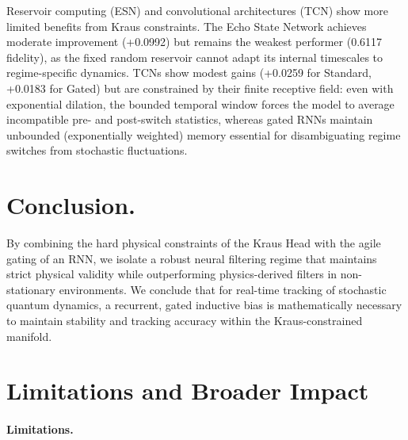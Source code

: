\documentclass{article} %
\begin{document}
Reservoir computing (ESN) and convolutional architectures (TCN) show more limited benefits from Kraus constraints. The Echo State Network achieves moderate improvement (+0.0992) but remains the weakest performer (0.6117 fidelity), as the fixed random reservoir cannot adapt its internal timescales to regime-specific dynamics. TCNs show modest gains (+0.0259 for Standard, +0.0183 for Gated) but are constrained by their finite receptive field: even with exponential dilation, the bounded temporal window forces the model to average incompatible pre- and post-switch statistics, whereas gated RNNs maintain unbounded (exponentially weighted) memory essential for disambiguating regime switches from stochastic fluctuations.

\section{Conclusion.}
By combining the hard physical constraints of the Kraus Head with the agile gating of an RNN, we isolate a robust neural filtering regime that maintains strict physical validity while outperforming physics-derived filters in non-stationary environments. We conclude that for real-time tracking of stochastic quantum dynamics, a recurrent, gated inductive bias is mathematically necessary to maintain stability and tracking accuracy within the Kraus-constrained manifold.


\section{Limitations and Broader Impact}
 \paragraph{Limitations.} 
\end{document}
